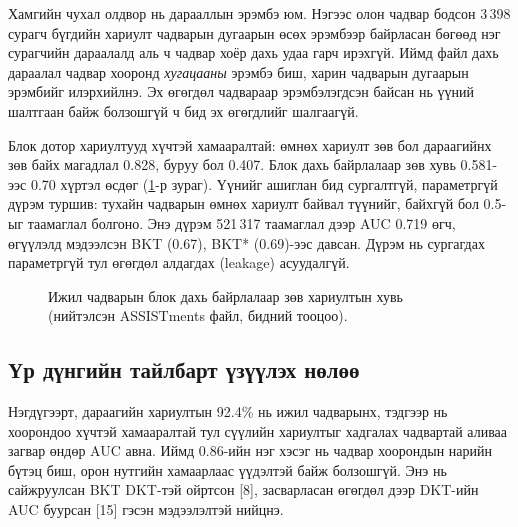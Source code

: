 \documentclass[10pt,twocolumn]{article}
\begin{document}
Хамгийн чухал олдвор нь дарааллын эрэмбэ юм. Нэгээс олон чадвар бодсон 3\,398 сурагч
бүгдийн хариулт чадварын дугаарын өсөх эрэмбээр байрласан бөгөөд нэг сурагчийн дараалалд аль
ч чадвар хоёр дахь удаа гарч ирэхгүй. Иймд файл дахь дараалал чадвар хооронд
\emph{хугацааны} эрэмбэ биш, харин чадварын дугаарын эрэмбийг илэрхийлнэ. Эх өгөгдөл чадвараар
эрэмбэлэгдсэн байсан нь үүний шалтгаан байж болзошгүй ч бид эх өгөгдлийг шалгаагүй.

Блок дотор хариултууд хүчтэй хамааралтай: өмнөх хариулт зөв бол дараагийнх зөв байх магадлал
0.828, буруу бол 0.407. Блок дахь байрлалаар зөв хувь 0.581-ээс 0.70 хүртэл өсдөг (\ref{fig:block}-р зураг).
Үүнийг ашиглан бид сургалтгүй, параметргүй дүрэм туршив: тухайн чадварын өмнөх хариулт
байвал түүнийг, байхгүй бол 0.5-ыг таамаглал болгоно. Энэ дүрэм 521\,317 таамаглал дээр AUC
0.719 өгч, өгүүлэлд мэдээлсэн BKT (0.67), BKT* (0.69)-ээс давсан. Дүрэм нь сургагдах параметргүй
тул өгөгдөл алдагдах (leakage) асуудалгүй.

\begin{figure}[t]
\centering
{}
\caption{Ижил чадварын блок дахь байрлалаар зөв хариултын хувь (нийтэлсэн ASSISTments файл,
бидний тооцоо).}
\label{fig:block}
\end{figure}

\subsection{Үр дүнгийн тайлбарт үзүүлэх нөлөө}
Нэгдүгээрт, дараагийн хариултын 92.4\% нь ижил чадварынх, тэдгээр нь хоорондоо хүчтэй
хамааралтай тул сүүлийн хариултыг хадгалах чадвартай аливаа загвар өндөр AUC авна. Иймд
0.86-ийн нэг хэсэг нь чадвар хоорондын нарийн бүтэц биш, орон нутгийн хамаарлаас үүдэлтэй байж
болзошгүй. Энэ нь сайжруулсан BKT DKT-тэй ойртсон [8], засварласан өгөгдөл дээр DKT-ийн AUC буурсан
[15] гэсэн мэдээлэлтэй нийцнэ.
\end{document}
